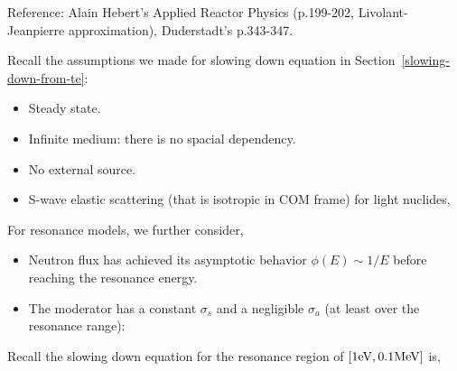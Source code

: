 \documentclass{school-22.211-notes}
\date{February 29, 2012}
\begin{document}
\maketitle




\clearpage
{}
Reference: Alain Hebert's Applied Reactor Physics (p.199-202, Livolant-Jeanpierre approximation), Duderstadt's p.343-347. 

Recall the assumptions we made for slowing down equation in Section~\ref{slowing-down-from-te}: 
\begin{itemize}
\item Steady state.
\item Infinite medium: there is no spacial dependency. 
\item No external source. 
\item S-wave elastic scattering (that is isotropic in COM frame) for light nuclides, 
\end{itemize}

For resonance models, we further consider, 
\begin{itemize}
\item Neutron flux has achieved its asymptotic behavior $\phi(E) \sim 1/E$ before reaching the resonance energy. 
\item The moderator has a constant $\sigma_s$ and a negligible $\sigma_a$ (at least over the resonance range): 
\end{itemize}

Recall the slowing down equation for the resonance region of $[1\mathrm{eV}, 0.1 \mathrm{MeV}]$ is, 
\end{document}
